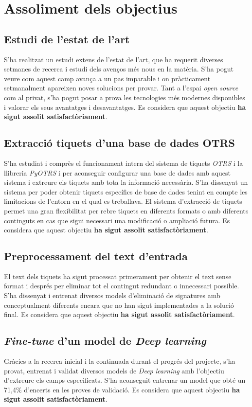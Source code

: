 \section{Assoliment dels objectius}

\subsection{Estudi de l'estat de l'art}
S'ha realitzat un estudi extens de l'estat de l'art, que ha requerit diverses setmanes de recerca i estudi dels avenços més nous en la matèria. S'ha pogut veure com aquest camp avança a un pas imparable i on pràcticament setmanalment apareixen noves solucions per provar. Tant a l'espai \textit{open source} com al privat, s'ha pogut posar a prova les tecnologies més modernes disponibles i valorar els seus avantatges i desavantatges. Es considera que aquest objectiu \textbf{ha sigut assolit satisfactòriament}.

\subsection{Extracció tiquets d'una base de dades OTRS}
S'ha estudiat i comprès el funcionament intern del sistema de tiquets \textit{OTRS} i la llibreria \textit{PyOTRS} i per aconseguir configurar una base de dades amb aquest sistema i extreure els tiquets amb tota la informació necessària. S'ha dissenyat un sistema per poder obtenir tiquets específics de base de dades tenint en compte les limitacions de l'entorn en el qual es treballava. El sistema d'extracció de tiquets permet una gran flexibilitat per rebre tiquets en diferents formats o amb diferents continguts en cas que sigui necessari una modificació o ampliació futura. Es considera que aquest objectiu \textbf{ha sigut assolit satisfactòriament}.

\subsection{Preprocessament del text d'entrada}
El text dels tiquets ha sigut processat primerament per obtenir el text sense format i després per eliminar tot el contingut redundant o innecessari possible. S'ha dissenyat i entrenat diversos models d'eliminació de signatures amb conceptualment diferents encara que no han sigut implementades a la solució final. Es considera que aquest objectiu \textbf{ha sigut assolit satisfactòriament}.

\subsection{\textit{Fine-tune} d'un model de \textit{Deep learning}}
Gràcies a la recerca inicial i la continuada durant el progrés del projecte, s'ha provat, entrenat i validat diversos models de \textit{Deep learning} amb l'objectiu d'extreure els camps especificats. S'ha aconseguit entrenar un model que obté un 71,4\% d'encerts en les proves de validació. Es considera que aquest objectiu \textbf{ha sigut assolit satisfactòriament}.


